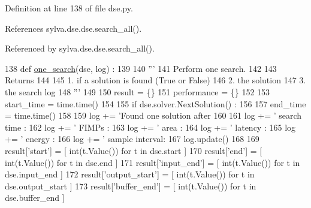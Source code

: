 Definition at line 138 of file dse.\+py.



References sylva.\+dse.\+dse.\+search\+\_\+all().



Referenced by sylva.\+dse.\+dse.\+search\+\_\+all().


\begin{DoxyCode}
138 \textcolor{keyword}{def }\hyperlink{namespacesylva_1_1dse_1_1dse_a27653b05dda8ab9dab8aa948db5b860a}{one\_search}(dse, log) :
139 
140   \textcolor{stringliteral}{'''}
141 \textcolor{stringliteral}{  Perform one search.}
142 \textcolor{stringliteral}{}
143 \textcolor{stringliteral}{  Returns}
144 \textcolor{stringliteral}{}
145 \textcolor{stringliteral}{  1. if a solution is found (True or False)}
146 \textcolor{stringliteral}{  2. the solution}
147 \textcolor{stringliteral}{  3. the search log}
148 \textcolor{stringliteral}{  '''}
149 
150   result = \{\}
151   performance = \{\}
152 
153   start\_time = time.time()
154 
155   \textcolor{keywordflow}{if} dse.solver.NextSolution() :
156 
157     end\_time = time.time()
158 
159     log += \textcolor{stringliteral}{'Found one solution after %
160          %
161     log += \textcolor{stringliteral}{'  search time    : %
162     log += \textcolor{stringliteral}{'  FIMPs          : %
163     log += \textcolor{stringliteral}{'  area           : %
164     log += \textcolor{stringliteral}{'  latency        : %
165     log += \textcolor{stringliteral}{'  energy         : %
166     log += \textcolor{stringliteral}{'  sample interval: %
167     log.update()
168 
169     result[\textcolor{stringliteral}{'start'}]        = [ int(t.Value()) \textcolor{keywordflow}{for} t \textcolor{keywordflow}{in} dse.start ]
170     result[\textcolor{stringliteral}{'end'}]          = [ int(t.Value()) \textcolor{keywordflow}{for} t \textcolor{keywordflow}{in} dse.end ]
171     result[\textcolor{stringliteral}{'input\_end'}]    = [ int(t.Value()) \textcolor{keywordflow}{for} t \textcolor{keywordflow}{in} dse.input\_end ]
172     result[\textcolor{stringliteral}{'output\_start'}] = [ int(t.Value()) \textcolor{keywordflow}{for} t \textcolor{keywordflow}{in} dse.output\_start ]
173     result[\textcolor{stringliteral}{'buffer\_end'}]   = [ int(t.Value()) \textcolor{keywordflow}{for} t \textcolor{keywordflow}{in} dse.buffer\_end ]
}}}}}}}
\end{DoxyCode}
